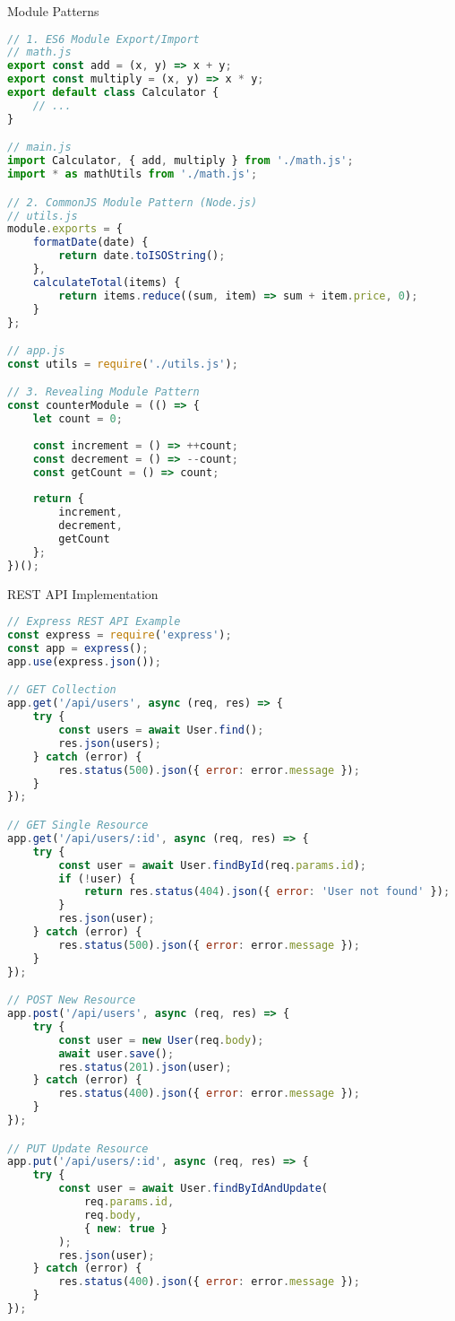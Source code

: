 \begin{KR}{Module Patterns}
\begin{lstlisting}[language=JavaScript, style=basesmol]
// 1. ES6 Module Export/Import
// math.js
export const add = (x, y) => x + y;
export const multiply = (x, y) => x * y;
export default class Calculator {
    // ... 
}

// main.js
import Calculator, { add, multiply } from './math.js';
import * as mathUtils from './math.js';

// 2. CommonJS Module Pattern (Node.js)
// utils.js
module.exports = {
    formatDate(date) {
        return date.toISOString();
    },
    calculateTotal(items) {
        return items.reduce((sum, item) => sum + item.price, 0);
    }
};

// app.js
const utils = require('./utils.js');

// 3. Revealing Module Pattern
const counterModule = (() => {
    let count = 0;
    
    const increment = () => ++count;
    const decrement = () => --count;
    const getCount = () => count;
    
    return {
        increment,
        decrement,
        getCount
    };
})();
\end{lstlisting}
\end{KR}

\begin{examplecode}{REST API Implementation}
\begin{lstlisting}[language=JavaScript, style=basesmol]
// Express REST API Example
const express = require('express');
const app = express();
app.use(express.json());

// GET Collection
app.get('/api/users', async (req, res) => {
    try {
        const users = await User.find();
        res.json(users);
    } catch (error) {
        res.status(500).json({ error: error.message });
    }
});

// GET Single Resource
app.get('/api/users/:id', async (req, res) => {
    try {
        const user = await User.findById(req.params.id);
        if (!user) {
            return res.status(404).json({ error: 'User not found' });
        }
        res.json(user);
    } catch (error) {
        res.status(500).json({ error: error.message });
    }
});

// POST New Resource
app.post('/api/users', async (req, res) => {
    try {
        const user = new User(req.body);
        await user.save();
        res.status(201).json(user);
    } catch (error) {
        res.status(400).json({ error: error.message });
    }
});

// PUT Update Resource
app.put('/api/users/:id', async (req, res) => {
    try {
        const user = await User.findByIdAndUpdate(
            req.params.id, 
            req.body,
            { new: true }
        );
        res.json(user);
    } catch (error) {
        res.status(400).json({ error: error.message });
    }
});
\end{lstlisting}
\end{examplecode}